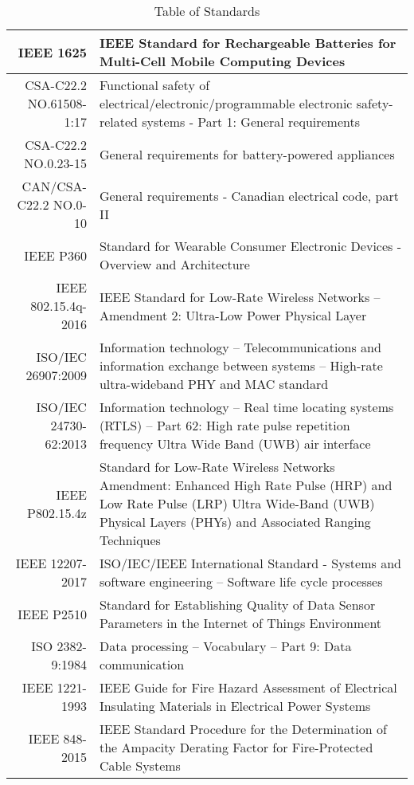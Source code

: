 \bgroup
\def\arraystretch{1.3}
\begin{table}[H]
\centering
\begin{tabular}{ |p{2.5cm} p{11.5cm} | }
\hline
\multicolumn{1}{|r|}{IEEE 1625} & IEEE Standard for Rechargeable Batteries for Multi-Cell Mobile Computing Devices \\ 
\hline
\multicolumn{1}{|r|}{CSA-C22.2 NO.61508-1:17} & Functional safety of electrical/electronic/programmable electronic safety-related systems - Part 1: General requirements \\ 
\hline
\multicolumn{1}{|r|}{CSA-C22.2 NO.0.23-15} & General requirements for battery-powered appliances \\  
\hline
\multicolumn{1}{|r|}{CAN/CSA-C22.2 NO.0-10} & General requirements - Canadian electrical code, part II \\ 
\hline
\multicolumn{1}{|r|}{IEEE P360} & Standard for Wearable Consumer Electronic Devices - Overview and Architecture \\  
\hline
\multicolumn{1}{|r|}{IEEE 802.15.4q-2016} & IEEE Standard for Low-Rate Wireless Networks --Amendment 2: Ultra-Low Power Physical Layer\\ 
\hline
\multicolumn{1}{|r|}{ISO/IEC 26907:2009} & Information technology -- Telecommunications and information exchange between systems -- High-rate ultra-wideband PHY and MAC standard\\  
\hline
\multicolumn{1}{|r|}{ISO/IEC 24730-62:2013} & Information technology -- Real time locating systems (RTLS) -- Part 62: High rate pulse repetition frequency Ultra Wide Band (UWB) air interface\\  
\hline
\multicolumn{1}{|r|}{IEEE P802.15.4z} & Standard for Low-Rate Wireless Networks Amendment: Enhanced High Rate Pulse (HRP) and Low Rate Pulse (LRP) Ultra Wide-Band (UWB) Physical Layers (PHYs) and Associated Ranging Techniques\\  
\hline
\multicolumn{1}{|r|}{IEEE 12207-2017} & ISO/IEC/IEEE International Standard - Systems and software engineering -- Software life cycle processes \\
\hline 
\multicolumn{1}{|r|}{IEEE P2510} & Standard for Establishing Quality of Data Sensor Parameters in the Internet of Things Environment \\ 
\hline
\multicolumn{1}{|r|}{ISO 2382-9:1984} & Data processing -- Vocabulary -- Part 9: Data communication \\
\hline 
\multicolumn{1}{|r|}{IEEE 1221-1993} & IEEE Guide for Fire Hazard Assessment of Electrical Insulating Materials in Electrical Power Systems \\ 
\hline
\multicolumn{1}{|r|}{IEEE 848-2015} & IEEE Standard Procedure for the Determination of the Ampacity Derating Factor for Fire-Protected Cable Systems\\ 
\hline
\end{tabular}
\caption{Table of Standards}
\end{table}	
